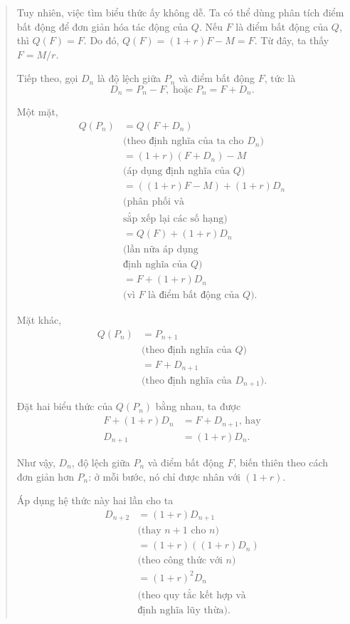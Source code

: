 {\begin{quote}
      Tuy nhiên, việc tìm biểu thức ấy không dễ. Ta có thể dùng phân tích điểm bất động để đơn giản hóa tác động của $Q$. Nếu $F$ là điểm bất động của $Q$, thì $Q(F)=F$. Do đó, $Q(F)=(1+r)F-M=F$. Từ đây, ta thấy $F=M/r$.

      Tiếp theo, gọi $D_n$ là độ lệch giữa $P_n$ và điểm bất động $F$, tức là
      $$
        D_n=P_n-F, \; \text{hoặc} \; P_n=F+D_n.
      $$

      Một mặt,
      \begin{align*}
      Q(P_n)
        &=Q(F+D_n) \\
          & \text{(theo định nghĩa của ta cho $D_n$)} \\
        &=(1+r)(F+D_n)-M \\
          & \text{(áp dụng định nghĩa của $Q$)} \\
        &=((1+r)F-M)+(1+r)D_n \\
          & \text{(phân phối và} \\
          & \text{sắp xếp lại các số hạng)} \\
        &=Q(F)+(1+r)D_n \\
          & \text{(lần nữa áp dụng} \\
          & \text{định nghĩa của $Q$)} \\
        &=F+(1+r)D_n \\
          & \text{(vì $F$ là điểm bất động của $Q$).}
      \end{align*}

      Mặt khác,
      \begin{align*}
      Q(P_n)
        &=P_{n+1} \\
          & \text{(theo định nghĩa của $Q$)} \\
        &=F+D_{n+1} \\
          & \text{(theo định nghĩa của $D_{n+1}$).}
      \end{align*}

      Đặt hai biểu thức của $Q(P_n)$ bằng nhau, ta được
      \begin{align*}
        F+(1+r)D_n&=F+D_{n+1}, \, \text{hay}\\
        D_{n+1}&=(1+r)D_n.
      \end{align*}

      Như vậy, $D_n$, độ lệch giữa $P_n$ và điểm bất động $F$, biến thiên theo cách đơn giản hơn $P_n$: ở mỗi bước, nó chỉ được nhân với $(1+r)$.\vspace{\baselineskip}

      Áp dụng hệ thức này hai lần cho ta
      \begin{align*}
        D_{n+2}
          &=(1+r)D_{n+1} \\
            & \text{(thay $n+1$ cho $n$)} \\
          &=(1+r)((1+r)D_n) \\
            & \text{(theo công thức với $n$)} \\
          &=(1+r)^2D_n \\
            & \text{(theo quy tắc kết hợp và} \\
            & \text{định nghĩa lũy thừa).}
      \end{align*}


\end{quote}}
